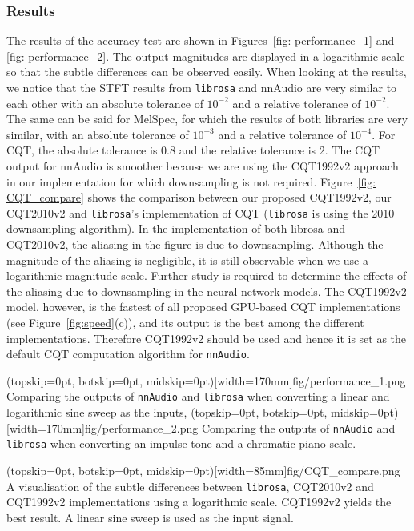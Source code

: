 \documentclass{ieeeaccess}
\newcommand{\nbh}[1]{\texttt{#1}}
\begin{document}
\subsubsection{Results}
The results of the accuracy test are shown in Figures~\ref{fig: performance_1} and \ref{fig: performance_2}. The output magnitudes are displayed in a logarithmic scale so that the subtle differences can be observed easily. When looking at the results, we notice that the STFT results from \nbh{librosa} and nnAudio are very similar to each other with an absolute tolerance of $10^{-2}$ and a relative tolerance of $10^{-2}$. The same can be said for MelSpec, for which the results of both libraries are very similar, with an absolute tolerance of $10^{-3}$ and a relative tolerance of $10^{-4}$. For CQT, the absolute tolerance is $0.8$ and the relative tolerance is $2$. The CQT output for nnAudio is smoother because we are using the CQT1992v2 approach in our implementation for which downsampling is not required. Figure~\ref{fig: CQT_compare} shows the comparison between our proposed CQT1992v2, our CQT2010v2 and \nbh{librosa}'s implementation of CQT (\nbh{librosa} is using the 2010 downsampling algorithm). In the implementation of both librosa and CQT2010v2, the aliasing in the figure is due to downsampling. Although the magnitude of the aliasing is negligible, it is still observable when we use a logarithmic magnitude scale. Further study is required to determine the effects of the aliasing due to downsampling in the neural network models. The CQT1992v2 model, however, is the fastest of all proposed GPU-based CQT implementations (see Figure~\ref{fig:speed}(c)), and its output is the best among the different implementations. Therefore CQT1992v2 should be used and hence it is set as the default CQT computation algorithm for \nbh{nnAudio}.

\Figure(topskip=0pt, botskip=0pt, midskip=0pt)[width=170mm]{fig/performance_1.png}
{Comparing the outputs of \nbh{nnAudio} and \nbh{librosa} when converting a linear and logarithmic sine sweep as the inputs, \label{fig: performance_1}}
\Figure(topskip=0pt, botskip=0pt, midskip=0pt)[width=170mm]{fig/performance_2.png}
{Comparing the outputs of \nbh{nnAudio} and \nbh{librosa} when converting an impulse tone and a chromatic piano scale. \label{fig: performance_2}}



\Figure(topskip=0pt, botskip=0pt, midskip=0pt)[width=85mm]{fig/CQT_compare.png}
{A visualisation of the subtle differences between \nbh{librosa}, CQT2010v2 and CQT1992v2 implementations using a logarithmic scale. CQT1992v2 yields the best result. A linear sine sweep is used as the input signal.\label{fig: CQT_compare}}
\end{document}
